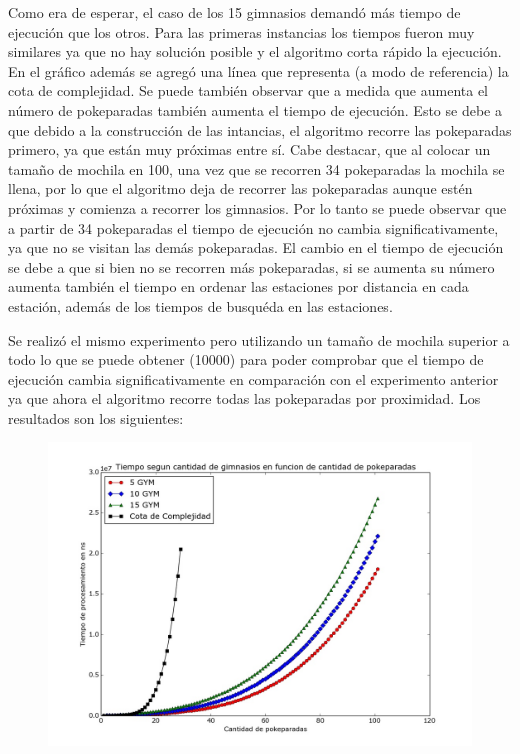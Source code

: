       Como era de esperar, el caso de los 15 gimnasios demandó más tiempo de ejecución que los otros. Para las primeras instancias los tiempos fueron muy similares ya que no hay solución posible y el algoritmo corta rápido la ejecución. En el gráfico además se agregó una línea que representa (a modo de referencia) la cota de complejidad. Se puede también observar que a medida que aumenta el número de pokeparadas también aumenta el tiempo de ejecución. Esto se debe a que debido a la construcción de las intancias, el algoritmo recorre las pokeparadas primero, ya que están muy próximas entre sí. Cabe destacar, que al colocar un tamaño de mochila en 100, una vez que se recorren 34 pokeparadas la mochila se llena, por lo que el algoritmo deja de recorrer las pokeparadas aunque estén próximas y comienza a recorrer los gimnasios. Por lo tanto se puede observar que a partir de 34 pokeparadas el tiempo de ejecución no cambia significativamente, ya que no se visitan las demás pokeparadas. El cambio en el tiempo de ejecución se debe a que si bien no se recorren más pokeparadas, si se aumenta su número aumenta también el tiempo en ordenar las estaciones por distancia en cada estación, además de los tiempos de busquéda en las estaciones. 

      Se realizó el mismo experimento pero utilizando un tamaño de mochila superior a todo lo que se puede obtener (10000) para poder comprobar que el tiempo de ejecución cambia significativamente en comparación con el experimento anterior ya que ahora el algoritmo recorre todas las pokeparadas por proximidad. Los resultados son los siguientes:

      \begin{figure}[H]
      \begin{center}
        \includegraphics[width=1.0\columnwidth]{imagenes/exp1_ej2_nuevo_mochila_grande.jpeg}
        \caption{}
      \end{center}
  \end{figure}

